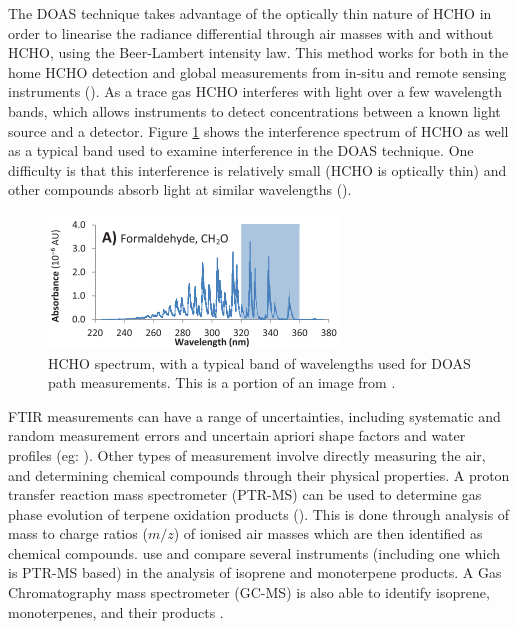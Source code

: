     The DOAS technique takes advantage of the optically thin nature of HCHO in order to linearise the radiance differential through air masses with and without HCHO, using the Beer-Lambert intensity law.
    This method works for both in the home HCHO detection and global measurements from in-situ and remote sensing instruments (\cite{Guenther1995, Abad2015, Davenport2015}).
    As a trace gas HCHO interferes with light over a few wavelength bands, which allows instruments to detect concentrations between a known light source and a detector.
    Figure \ref{LR:HCHO:Measurements:fig_HCHOSpectrum} shows the interference spectrum of HCHO as well as a typical band used to examine interference in the DOAS technique.
    One difficulty is that this interference is relatively small (HCHO is optically thin) and other compounds absorb light at similar wavelengths (\cite{Davenport2015}).
    
    \begin{figure}
      \includegraphics{Figures/HCHO/HCHOAbsorbanceDavenport.png}
      \caption{ %
        HCHO spectrum, with a typical band of wavelengths used for DOAS path measurements.
        This is a portion of an image from \cite{Davenport2015}.}
      \label{LR:HCHO:Measurements:fig_HCHOSpectrum}
    \end{figure}
    
    FTIR measurements can have a range of uncertainties, including systematic and random measurement errors and uncertain apriori shape factors and water profiles (eg: \cite{Franco2015}).
    Other types of measurement involve directly measuring the air, and determining chemical compounds through their physical properties.
    A proton transfer reaction mass spectrometer (PTR-MS) can be used to determine gas phase evolution of terpene oxidation products (\cite[eg.]{Lee2006a,Nguyen2014,Wolfe2016}).
    This is done through analysis of mass to charge ratios ($m/z$) of ionised air masses which are then identified as chemical compounds.
    \cite{Nguyen2014} use and compare several instruments (including one which is PTR-MS based) in the analysis of isoprene and monoterpene products.
    A Gas Chromatography mass spectrometer (GC-MS) is also able to identify isoprene, monoterpenes, and their products \cite[eg.]{Nguyen2014}.
    
